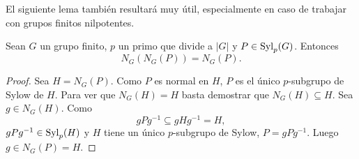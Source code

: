 %
%
%





El siguiente lema también resultará muy útil, especialmente en caso de trabajar con 
grupos finitos nilpotentes. 

\begin{lemma}
	\label{lemma:normalizador}
	Sean $G$ un grupo finito, $p$ un primo que divide a $|G|$ y
	$P\in\mathrm{Syl}_p(G)$. Entonces
	\[
	N_G(N_G(P))=N_G(P). 
	\]
\end{lemma}

\begin{proof}
	Sea $H=N_G(P)$. Como $P$ es normal en $H$, $P$ es el único $p$-subgrupo de
	Sylow de $H$. Para ver que $N_G(H)=H$ basta demostrar que $N_G(H)\subseteq
	H$. Sea $g\in N_G(H)$. Como 
	\[
	gPg^{-1}\subseteq gHg^{-1}=H,
	\]
	$gPg^{-1}\in\mathrm{Syl}_p(H)$ y $H$ tiene un único $p$-subgrupo de Sylow, 
	$P=gPg^{-1}$.  Luego $g\in N_G(P)=H$. 
\end{proof}


